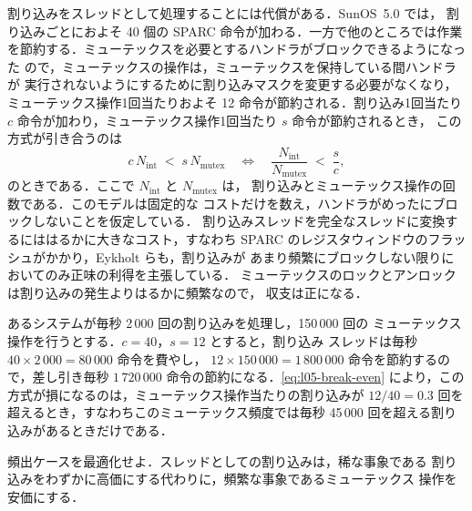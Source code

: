 \documentclass[../main.tex]{subfiles}
\begin{document}
割り込みをスレッドとして処理することには代償がある．SunOS~5.0 では，
割り込みごとにおよそ 40 個の SPARC 命令が加わる．一方で他のところでは作業
を節約する．ミューテックスを必要とするハンドラがブロックできるようになった
ので，ミューテックスの操作は，ミューテックスを保持している間ハンドラが
実行されないようにするために割り込みマスクを変更する必要がなくなり，
ミューテックス操作1回当たりおよそ 12 命令が節約される．割り込み1回当たり
$c$ 命令が加わり，ミューテックス操作1回当たり $s$ 命令が節約されるとき，
この方式が引き合うのは
\begin{equation}
  c\, N_{\mathrm{int}} \;<\; s\, N_{\mathrm{mutex}}
  \quad\Longleftrightarrow\quad
  \frac{N_{\mathrm{int}}}{N_{\mathrm{mutex}}} \;<\; \frac{s}{c},
  \label{eq:l05-break-even}
\end{equation}
のときである．ここで $N_{\mathrm{int}}$ と $N_{\mathrm{mutex}}$ は，
割り込みとミューテックス操作の回数である．このモデルは固定的な
コストだけを数え，ハンドラがめったにブロックしないことを仮定している．
割り込みスレッドを完全なスレッドに変換するにははるかに大きなコスト，すなわち
SPARC のレジスタウィンドウのフラッシュがかかり，Eykholt らも，割り込みが
あまり頻繁にブロックしない限りにおいてのみ正味の利得を主張している．
ミューテックスのロックとアンロックは割り込みの発生よりはるかに頻繁なので，
収支は正になる．%

\begin{example}
  あるシステムが毎秒 2\,000 回の割り込みを処理し，150\,000 回の
  ミューテックス操作を行うとする．$c = 40$，$s = 12$ とすると，割り込み
  スレッドは毎秒 $40 \times 2\,000 = 80\,000$ 命令を費やし，
  $12 \times 150\,000 = 1\,800\,000$ 命令を節約するので，差し引き毎秒
  $1\,720\,000$ 命令の節約になる．\cref{eq:l05-break-even} により，この
  方式が損になるのは，ミューテックス操作当たりの割り込みが
  $12/40 = 0.3$ 回を超えるとき，すなわちこのミューテックス頻度では毎秒
  45\,000 回を超える割り込みがあるときだけである．
\end{example}

\begin{keypoint}
  頻出ケースを最適化せよ．スレッドとしての割り込みは，稀な事象である
  割り込みをわずかに高価にする代わりに，頻繁な事象であるミューテックス
  操作を安価にする．
\end{keypoint}
\end{document}
